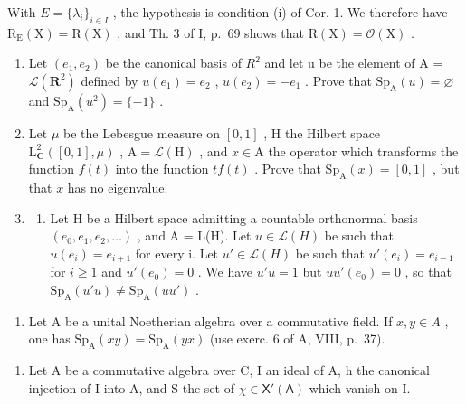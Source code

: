 With \(E = \{\lambda_{i}\}_{i \in I}\) , the hypothesis is condition (i) of Cor. 1. We therefore have \(\mathrm{R}_{\mathrm{E}}(\mathrm{X}) = \mathrm{R}(\mathrm{X})\) , and Th. 3 of I, p.~69 shows that \(\mathrm{R}(\mathrm{X}) = \mathcal{O}(\mathrm{X})\) .



\begin{enumerate}
\def\labelenumi{\arabic{enumi})}
\item
  Let \((e_{1}, e_{2})\) be the canonical basis of \(R^{2}\) and let u be the element of A = \(\mathcal{L}(\mathbf{R}^{2})\) defined by \(u(e_{1}) = e_{2}\) , \(u(e_{2}) = -e_{1}\) . Prove that \(\mathrm{Sp}_{\mathrm{A}}(u) = \varnothing\) and \(\mathrm{Sp}_{\mathrm{A}}(u^{2}) = \{-1\}\) .
\item
  Let \(\mu\) be the Lebesgue measure on \([0,1]\) , H the Hilbert space \(\mathrm{L}_{\mathbf{C}}^{2}([0,1],\mu)\) , \(\mathrm{A} = \mathcal{L}(\mathrm{H})\) , and \(x \in \mathrm{A}\) the operator which transforms the function \(f(t)\) into the function \(tf(t)\) . Prove that \(\mathrm{Sp}_{\mathrm{A}}(x) = [0,1]\) , but that \(x\) has no eigenvalue.
\item
  \begin{enumerate}
  \def\labelenumii{\alph{enumii})}
  \tightlist
  \item
    Let H be a Hilbert space admitting a countable orthonormal basis \((e_{0}, e_{1}, e_{2}, \ldots)\) , and A = L(H). Let \(u \in \mathcal{L}(H)\) be such that \(u(e_{i}) = e_{i+1}\) for every i. Let \(u' \in \mathcal{L}(H)\) be such that \(u'(e_{i}) = e_{i-1}\) for \(i \geqslant 1\) and \(u'(e_{0}) = 0\) . We have \(u'u = 1\) but \(uu'(e_{0}) = 0\) , so that \(\mathrm{Sp}_{\mathrm{A}}(u'u) \neq \mathrm{Sp}_{\mathrm{A}}(uu')\) .
  \end{enumerate}
\end{enumerate}

\begin{enumerate}
\def\labelenumi{\alph{enumi})}
\setcounter{enumi}{1}
\tightlist
\item
  Let A be a unital Noetherian algebra over a commutative field. If \(x, y \in A\) , one has \(\mathrm{Sp}_{\mathrm{A}}(xy) = \mathrm{Sp}_{\mathrm{A}}(yx)\) (use exerc. 6 of A, VIII, p.~37).
\end{enumerate}

\begin{enumerate}
\def\labelenumi{\arabic{enumi})}
\setcounter{enumi}{3}
\tightlist
\item
  Let A be a commutative algebra over C, I an ideal of A, h the canonical injection of I into A, and S the set of \(\chi \in \mathsf{X}'(\mathsf{A})\) which vanish on I.
\end{enumerate}

